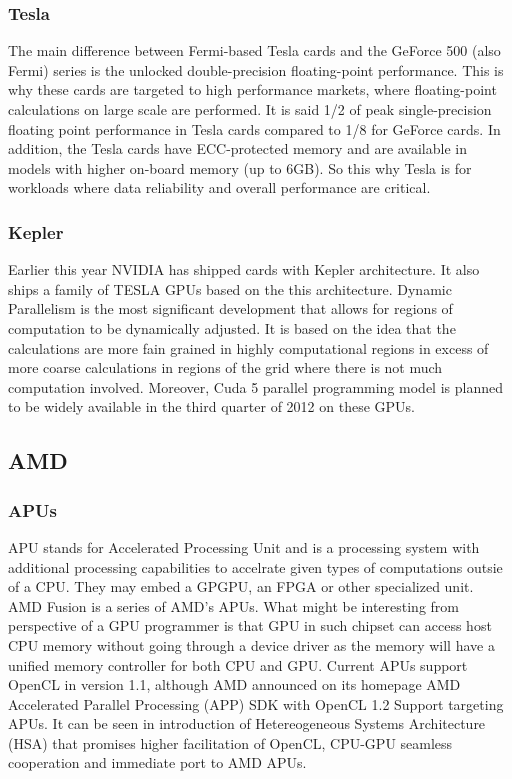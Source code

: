 
\subsubsection{Tesla}
The main difference between Fermi-based Tesla cards and the GeForce 500 (also Fermi) series is the unlocked double-precision floating-point performance. This is why these cards are targeted to high performance markets, where floating-point calculations on large scale are performed. It is said 1/2 of peak single-precision floating point performance in Tesla cards compared to 1/8 for GeForce cards. In addition, the Tesla cards have ECC-protected memory and are available in models with higher on-board memory (up to 6GB). So this why Tesla is for workloads where data reliability and overall performance are critical.

\subsubsection{Kepler}
Earlier this year NVIDIA has shipped cards with Kepler architecture. It also ships a family of TESLA GPUs based on the this architecture. Dynamic Parallelism is the most significant development that allows for regions of computation to be dynamically adjusted. It is based on the idea that the calculations are more fain grained in highly computational regions in excess of more coarse calculations in regions of the grid where there is not much computation involved. Moreover, Cuda 5 parallel programming model is planned to be widely available in the third quarter of 2012 on these GPUs.


\subsection{AMD}

\subsubsection{APUs}
APU stands for Accelerated Processing Unit and is a processing system with additional processing capabilities to accelrate given types of computations outsie of a CPU. They may embed a GPGPU, an FPGA or other specialized unit. AMD Fusion is a series of AMD's APUs. What might be interesting from perspective of a GPU programmer is that GPU in such chipset can access host CPU memory without going through a device driver as the memory will have a unified memory controller for both CPU and GPU. Current APUs support OpenCL in version 1.1, although AMD announced on its homepage AMD Accelerated Parallel Processing (APP) SDK with OpenCL 1.2 Support targeting APUs. It can be seen in introduction of Hetereogeneous Systems Architecture (HSA) that promises higher facilitation of OpenCL, CPU-GPU seamless cooperation and immediate port to AMD APUs.

